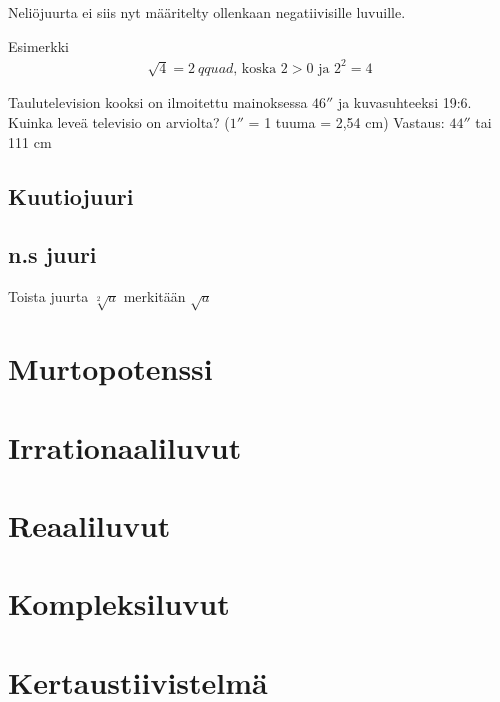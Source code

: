 Neliöjuurta ei siis nyt määritelty ollenkaan negatiivisille luvuille.


Esimerkki
\begin{align*}
\sqrt{4} = 2\ qquad\textrm{, koska $2>0$ ja $2^2 =4$} 
\end{align*}

Taulutelevision kooksi on ilmoitettu mainoksessa $46''$ ja kuvasuhteeksi 19:6. Kuinka leveä televisio on arviolta? ($1''$ = 1 tuuma = 2,54 cm)
Vastaus: $44''$ tai 111 cm

\section{Kuutiojuuri}


\section{n.s juuri}
Toista juurta $\sqrt[2]{a}$ merkitään $\sqrt{a}$



\chapter{Murtopotenssi}
\chapter{Irrationaaliluvut}
\chapter{Reaaliluvut}
\chapter{Kompleksiluvut}
\chapter{Kertaustiivistelmä}
